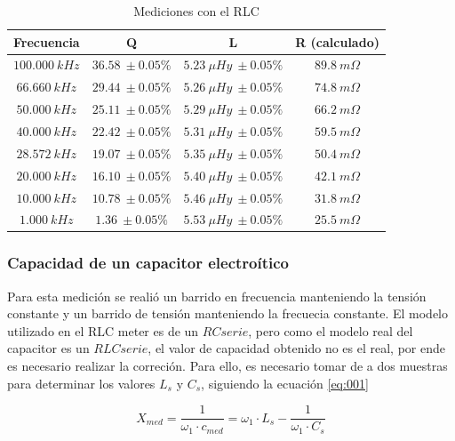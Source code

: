 \documentclass[a4paper,10pt]{article}
\begin{document}
		\begin{table}[!htp]
			\centering
			\begin{tabular}{|c|c|c|c|}
				\hline
				Frecuencia & Q & L  & R (calculado) \\
				\hline
				$100.000~kHz$& $36.58~\pm0.05\%$ & $5.23~\mu Hy~\pm0.05\%$ &
				$ 89.8~m\Omega$ \\
				\hline
				$66.660~kHz$& $29.44~\pm0.05\%$ & $5.26~\mu Hy~\pm0.05\%$ &
				$ 74.8~m\Omega$ \\
				\hline
				$50.000~kHz$& $25.11~\pm0.05\%$ & $5.29~\mu Hy~\pm0.05\%$ &
				$ 66.2~m\Omega$ \\
				\hline  
				$40.000~kHz$& $22.42~\pm0.05\%$ & $5.31~\mu Hy~\pm0.05\%$ &
				$ 59.5~m\Omega$ \\
				\hline  										
				$28.572~kHz$& $19.07~\pm0.05\%$ & $5.35~\mu Hy~\pm0.05\%$ &
				$ 50.4~m\Omega$ \\
				\hline
				$20.000~kHz$& $16.10~\pm0.05\%$ & $5.40~\mu Hy~\pm0.05\%$ &
				$ 42.1~m\Omega$ \\
				\hline  
				$10.000~kHz$& $10.78~\pm0.05\%$ & $5.46~\mu Hy~\pm0.05\%$ &
				$ 31.8~m\Omega$ \\
				\hline 										
				$1.000~kHz$& $1.36~\pm0.05\%$ & $5.53~\mu Hy~\pm0.05\%$ &
				$ 25.5~m\Omega$ \\
				\hline 	  
			\end{tabular}
			\caption{Mediciones con el RLC} \label{tabRLCbobina}
		\end{table}
				
		\subsubsection{Capacidad de un capacitor electro\'itico}	
		\indent Para esta medición se realió un barrido en frecuencia 
		manteniendo la tensión constante y un barrido de tensión manteniendo la
		frecuecia constante. El modelo utilizado en el RLC meter es de un $RC 
		serie$, pero como el modelo real del capacitor es un $RLC serie$, el 
		valor de capacidad obtenido no es el real, por ende es necesario 
		realizar la correción. Para ello, es necesario tomar de a dos muestras
		para determinar los valores $L_s$ y $C_s$, siguiendo la ecuación 
		\ref{eq:001}
		
		\begin{equation}\label{eq:001}
			X_{med} = \frac{1}{\omega_1\cdot c_{med}} = \omega_1\cdot L_s - 
			\frac{1}{\omega_1\cdot C_s}
		\end{equation}
		
\end{document}
